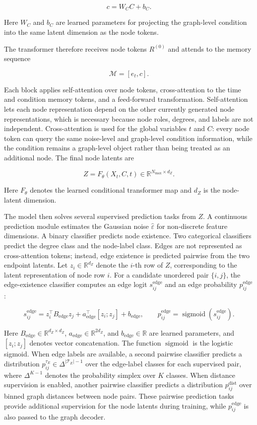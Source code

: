 \[
    c = W_C C + b_C.
\]

Here \(W_C\) and \(b_C\) are learned parameters for projecting the graph-level
condition into the same latent dimension as the node tokens.

The transformer therefore receives node tokens \(R^{(0)}\) and attends to the
memory sequence

\[
    \mathcal{M} = [e_t, c].
\]

Each block applies self-attention over node tokens, cross-attention to the time
and condition memory tokens, and a feed-forward transformation. Self-attention
lets each node representation depend on the other currently generated node
representations, which is necessary because node roles, degrees, and labels are
not independent. Cross-attention is used for the global variables \(t\) and
\(C\): every node token can query the same noise-level and graph-level
condition information, while the condition remains a graph-level object rather
than being treated as an additional node. The final node latents are

\[
    Z = F_\theta(X_t, C, t) \in
    \mathbb{R}^{N_{\max} \times d_Z}.
\]

Here \(F_\theta\) denotes the learned conditional transformer map and \(d_Z\)
is the node-latent dimension.

The model then solves several supervised prediction tasks from \(Z\). A
continuous prediction module estimates the Gaussian noise
\(\hat{\varepsilon}\) for non-discrete feature dimensions. A binary classifier
predicts node existence. Two categorical classifiers predict the degree class
and the node-label class. Edges are not represented as cross-attention tokens;
instead, edge existence is predicted pairwise from the two endpoint latents.
Let \(z_i\in\mathbb{R}^{d_Z}\) denote the \(i\)-th row of \(Z\), corresponding
to the latent representation of node row \(i\). For a candidate unordered pair
\(\{i,j\}\), the edge-existence classifier computes an edge logit
\(s^{\mathrm{edge}}_{ij}\) and an edge probability
\(p^{\mathrm{edge}}_{ij}\):

\[
    s^{\mathrm{edge}}_{ij}
    =
    z_i^\top B_{\mathrm{edge}} z_j
    +
    a_{\mathrm{edge}}^\top [z_i;z_j]
    +
    b_{\mathrm{edge}},
    \qquad
    p^{\mathrm{edge}}_{ij}
    =
    \operatorname{sigmoid}(s^{\mathrm{edge}}_{ij}).
\]

Here \(B_{\mathrm{edge}}\in\mathbb{R}^{d_Z\times d_Z}\),
\(a_{\mathrm{edge}}\in\mathbb{R}^{2d_Z}\), and
\(b_{\mathrm{edge}}\in\mathbb{R}\) are learned parameters, and
\([z_i;z_j]\) denotes vector concatenation. The function
\(\operatorname{sigmoid}\) is the logistic sigmoid. When edge labels are available, a
second pairwise classifier predicts a distribution
\(p^{\tau_E}_{ij}\in\Delta^{|\mathcal{T}_E|-1}\) over the edge-label classes
for each supervised pair, where \(\Delta^{K-1}\) denotes the probability
simplex over \(K\) classes. When distance supervision is enabled, another
pairwise classifier predicts a distribution
\(p^{\mathrm{dist}}_{ij}\) over binned graph distances between node pairs. These
pairwise prediction tasks provide additional supervision for the node latents
during training, while \(p^{\mathrm{edge}}_{ij}\) is also passed to the graph
decoder.

